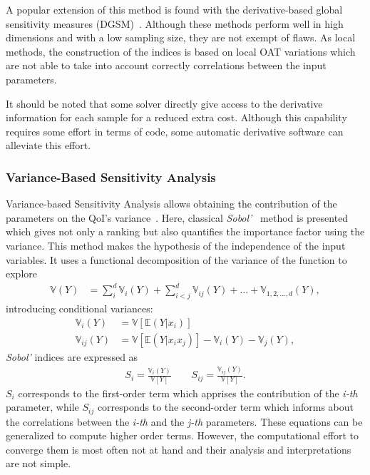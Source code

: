 A popular extension of this method is found with the derivative-based global sensitivity measures (DGSM)~\cite{kucherenko2016,Becker2018}. Although these methods perform well in high dimensions and with a low sampling size, they are not exempt of flaws. As local methods, the construction of the indices is based on local OAT variations which are not able to take into account correctly correlations between the input parameters. 

It should be noted that some solver directly give access to the derivative information for each sample for a reduced extra cost. Although this capability requires some effort in terms of code, some automatic derivative software can alleviate this effort.

\subsubsection{Variance-Based Sensitivity Analysis}
Variance-based Sensitivity Analysis allows obtaining the contribution of the parameters on the QoI's variance~\cite{ferretti2016}. Here, classical \textit{Sobol'}~\cite{Sobol1993} method is presented which gives not only a ranking but also quantifies the importance factor using the variance. This method makes the hypothesis of the independence of the input variables. It uses a functional decomposition of the variance of the function to explore
\begin{align}
\mathbb{V}(Y) &= \sum_{i}^{d} \mathbb{V}_i (Y) + \sum_{i<j}^{d}\mathbb{V}_{ij}(Y) + ... + \mathbb{V}_{1,2,...,d}(Y),
\end{align}
\noindent introducing conditional variances:
\begin{align}
\mathbb{V}_i(Y) &= \mathbb{\mathbb{V}}[\mathbb{E}(Y|x_i)]\nonumber\\
\mathbb{V}_{ij}(Y) &= \mathbb{\mathbb{V}}[\mathbb{E}(Y|x_i x_j)] - \mathbb{V}_i(Y) - \mathbb{V}_j(Y),\nonumber
\end{align}
\noindent \textit{Sobol'} indices are expressed as
\begin{align}
S_i = \frac{\mathbb{V}_i(Y)}{\mathbb{V}[Y]}\qquad S_{ij} = \frac{\mathbb{V}_{ij}(Y)}{\mathbb{V}[Y]}.
\end{align}
\noindent $S_{i}$ corresponds to the first-order term which apprises the contribution of the \textit{i-th} parameter, while $S_{ij}$ corresponds to the second-order term which informs about the correlations between the \textit{i-th} and the \textit{j-th} parameters. These equations can be generalized to compute higher order terms. However, the computational effort to converge them is most often not at hand and their analysis and interpretations are not simple.

